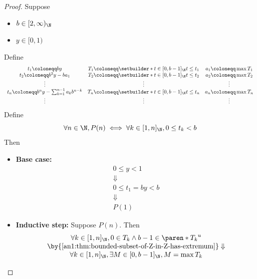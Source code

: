 \begin{proof}
  Suppose
  \begin{itemize}
    \item $b \in [2, \infty)_{\N}$
    \item $y \in [0, 1)$
  \end{itemize}
  Define
  \[
    \begin{array}{c@{\quad}c@{\quad}c}
      t_{1} \coloneqq by
       & T_{1} \coloneqq \setbuilder*{t \in [0, b - 1]_{\N}}{t \leq t_{1}}
       & a_{1} \coloneqq \max T_{1}                                        \\
      t_{2} \coloneqq b^{2}y - ba_{1}
       & T_{2} \coloneqq \setbuilder*{t \in [0, b - 1]_{\N}}{t \leq t_{2}}
       & a_{2} \coloneqq \max T_{2}                                        \\
      \vdots
       & \vdots
       & \vdots                                                            \\
      t_{n} \coloneqq b^{n}y - \sum_{k = 1}^{n - 1} a_{k}b^{n - k}
       & T_{n} \coloneqq \setbuilder*{t \in [0, b - 1]_{\N}}{t \leq t_{n}}
       & a_{n} \coloneqq \max T_{n}                                        \\
      \vdots
       & \vdots
       & \vdots
    \end{array}
  \]
  Define
  \[
    \forall n \in \N, P(n) \iff \forall k \in [1, n]_{\N}, 0 \leq t_{k} < b
  \]
  Then
  \begin{itemize}
    \item \textbf{Base case:}
          \[
            \begin{array}{c}
              0 \leq y < 1          \\
              \Downarrow            \\
              0 \leq t_{1} = by < b \\
              \Downarrow            \\
              P(1)
            \end{array}
          \]
    \item \textbf{Inductive step:} Suppose $P(n)$. Then
          \[
            \begin{array}{c}
              \forall k \in [1, n]_{\N}, 0 \in T_{k} \land b - 1 \in \paren*{T_{k}}^{u} \\
              \by{\Cref{an1:thm:bounded-subset-of-Z-in-Z-has-extremum}} \Downarrow      \\
              \forall k \in [1, n]_{\N}, \exists M \in [0, b - 1]_{\N}, M = \max T_{k}

\end{array}\]
\end{itemize}
\end{proof}
